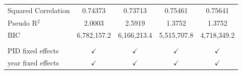 \begin{tabular}{lcccc}
   Squared Correlation & 0.74373       & 0.73713        & 0.75461       & 0.75641\\  
   Pseudo R$^2$        & 2.0003        & 2.5919         & 1.3752        & 1.3752\\  
   BIC                 & 6,782,157.2   & 6,166,213.4    & 5,515,707.8   & 4,718,349.2\\  
    \\
   PID fixed effects   & $\checkmark$  & $\checkmark$   & $\checkmark$  & $\checkmark$\\   
   year fixed effects  & $\checkmark$  & $\checkmark$   & $\checkmark$  & $\checkmark$\\   
   \bottomrule
\end{tabular}
\par\endgroup


